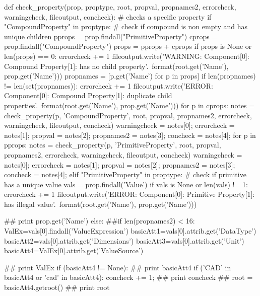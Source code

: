 \begin{MyVerbatim}
def check_property(prop, proptype, root, propval, propnames2, errorcheck, 
       warningcheck, fileoutput, concheck):  # checks a specific property
    if "CompoundProperty" in proptype:
        # check if compound is non empty and has unique children
        pprops = prop.findall("PrimitiveProperty")
        cprops = prop.findall("CompoundProperty")
        props = pprops + cprops
        if props is None or len(props) == 0:
            errorcheck += 1
            fileoutput.write('WARNING: Component[{0}]: Compound 
              Property[{1}]: has no child property\n'.\
                format(root.get('Name'), prop.get('Name')))
        propnames = [p.get('Name') for p in props]
        if len(propnames) != len(set(propnames)):
            errorcheck += 1
            fileoutput.write('ERROR: Component[{0}]: Compound 
              Property[{1}]: duplicate child properties\n'.\
                format(root.get('Name'), prop.get('Name')))
        for p in cprops:
            notes = check_property(p, 'CompoundProperty', root, propval, 
              propnames2, errorcheck, warningcheck, fileoutput, concheck)
            warningcheck = notes[0];
            errorcheck = notes[1];
            propval = notes[2];
            propnames2 = notes[3];
            concheck = notes[4];
        for p in pprops:
            notes = check_property(p, 'PrimitiveProperty', root, propval, 
              propnames2, errorcheck, warningcheck, fileoutput, concheck)
            warningcheck = notes[0];
            errorcheck = notes[1];
            propval = notes[2];
            propnames2 = notes[3];
            concheck = notes[4];
    elif "PrimitiveProperty" in proptype:
        # check if primitive has a unique value
        vals = prop.findall('Value')
        if vals is None or len(vals) != 1:
            errorcheck += 1
            fileoutput.write('ERROR: Component[{0}]: Primitive 
             Property[{1}]: has illegal value\n'.\
                format(root.get('Name'), prop.get('Name')))

            ## print prop.get('Name')
        else:
            ##if len(propnames2) < 16:
                ValEx=vals[0].findall('ValueExpression')
                basicAtt1=vals[0].attrib.get('DataType')
                basicAtt2=vals[0].attrib.get('Dimensions')
                basicAtt3=vals[0].attrib.get('Unit')
                basicAtt4=ValEx[0].attrib.get('ValueSource')
                
##                print ValEx
                if (basicAtt4 != None):
##                    print basicAtt4
                    if ('CAD' in basicAtt4 or 'cad' in basicAtt4):
                        concheck += 1;
##                        print concheck
##                    root = basicAtt4.getroot()
##                    print root
                    

\end{MyVerbatim}
